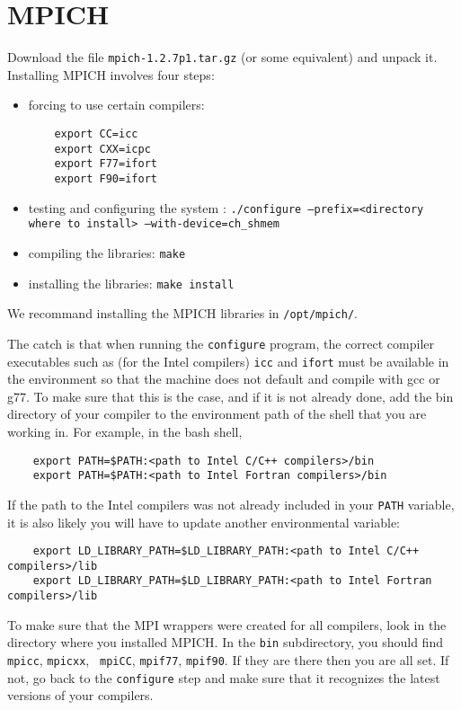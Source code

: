 \documentclass[10pt, oneside, onecolumn]{article}
\begin{document}
  \section{MPICH}
  
  Download the file {\tt mpich-1.2.7p1.tar.gz} (or some equivalent) and 
  unpack it.  Installing MPICH involves four steps: 
  \begin{itemize}
    \item forcing to use certain compilers:
      \begin{verbatim}
	export CC=icc
	export CXX=icpc
	export F77=ifort
	export F90=ifort
      \end{verbatim}
    \item testing and configuring the system : {\tt ./configure
      --prefix=<directory where to install> --with-device=ch\_shmem}
    \item compiling the libraries: {\tt make}
    \item installing the libraries: {\tt make install}
  \end{itemize}
  We recommand installing the MPICH libraries in {\tt /opt/mpich/}.
  
  The catch is that when running the {\tt configure} program, the correct
  compiler executables such as (for the Intel compilers) {\tt icc} and 
  {\tt ifort} must be available in the environment so that the machine does 
  not default and compile with gcc or g77. To make sure that this is 
  the case, and if it is not already done, add the bin directory of
  your compiler to the environment path of the shell that you are
  working in. For example, in the bash 
  shell,
  \begin{verbatim}
    export PATH=$PATH:<path to Intel C/C++ compilers>/bin
    export PATH=$PATH:<path to Intel Fortran compilers>/bin
  \end{verbatim}
  If the path to the Intel compilers was not already included in your
  {\tt PATH} variable, it is also likely you will have to update
  another environmental variable:
  \begin{verbatim}
    export LD_LIBRARY_PATH=$LD_LIBRARY_PATH:<path to Intel C/C++ compilers>/lib
    export LD_LIBRARY_PATH=$LD_LIBRARY_PATH:<path to Intel Fortran compilers>/lib
  \end{verbatim}

  To make sure that the MPI wrappers were created for all compilers,
  look in the directory where you installed MPICH. In the {\tt bin}
  subdirectory, you should find {\tt mpicc}, {\tt mpicxx}, {\tt
  mpiCC}, {\tt mpif77}, {\tt mpif90}. If they are there then you are
  all set.  If not, go back to the {\tt configure} step and make sure that
  it recognizes the latest versions of your compilers.  
\end{document}
